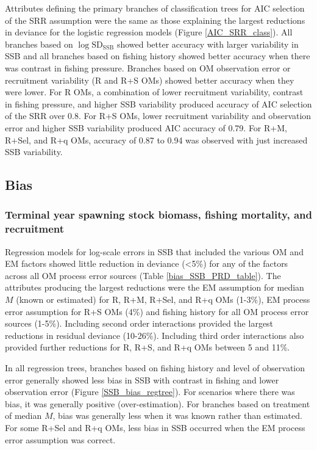 \documentclass[
  12pt,
]{article}
\begin{document}
Attributes defining the primary branches of classification trees for AIC
selection of the SRR assumption were the same as those explaining the
largest reductions in deviance for the logistic regression models
(Figure \ref{AIC_SRR_class}). All branches based on
\(\log \text{SD}_{\text{SSB}}\) showed better accuracy with larger
variability in SSB and all branches based on fishing history showed
better accuracy when there was contrast in fishing pressure. Branches
based on OM observation error or recruitment variability (R and R+S OMs)
showed better accuracy when they were lower. For R OMs, a combination of
lower recruitment variability, contrast in fishing pressure, and higher
SSB variability produced accuracy of AIC selection of the SRR over 0.8.
For R+S OMs, lower recruitment variability and observation error and
higher SSB variability produced AIC accuracy of 0.79. For R+M, R+Sel,
and R+q OMs, accuracy of 0.87 to 0.94 was observed with just increased
SSB variability.

\subsection*{Bias}\label{bias-1}

\subsubsection*{Terminal year spawning stock biomass, fishing mortality,
and
recruitment}\label{terminal-year-spawning-stock-biomass-fishing-mortality-and-recruitment}

Regression models for log-scale errors in SSB that included the various
OM and EM factors showed little reduction in deviance (\textless5\%) for
any of the factors across all OM process error sources (Table
\ref{bias_SSB_PRD_table}). The attributes producing the largest
reductions were the EM assumption for median \(M\) (known or estimated)
for R, R+M, R+Sel, and R+q OMs (1-3\%), EM process error assumption for
R+S OMs (4\%) and fishing history for all OM process error sources
(1-5\%). Including second order interactions provided the largest
reductions in residual deviance (10-26\%). Including third order
interactions also provided further reductions for R, R+S, and R+q OMs
between 5 and 11\%.

In all regression trees, branches based on fishing history and level of
observation error generally showed less bias in SSB with contrast in
fishing and lower observation error (Figure \ref{SSB_bias_regtree}). For
scenarios where there was bias, it was generally positive
(over-estimation). For branches based on treatment of median \(M\), bias
was generally less when it was known rather than estimated. For some
R+Sel and R+q OMs, less bias in SSB occurred when the EM process error
assumption was correct.
\end{document}
